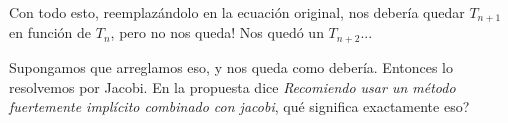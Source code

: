\documentclass[a4paper]{article}
\begin{document}
Con todo esto, reemplazándolo en la ecuación original, nos debería quedar $T_{n+1}$ en función de $T_n$, pero no nos queda! Nos quedó un $T_{n+2}$...

Supongamos que arreglamos eso, y nos queda como debería. Entonces lo resolvemos por Jacobi. En la propuesta dice \textit{Recomiendo usar un método fuertemente implícito combinado con jacobi}, qué significa exactamente eso?
\end{document}
